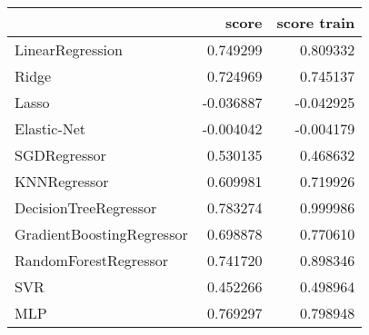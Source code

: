 \begin{tabular}{lrr}
\toprule
{} &     score &  score train \\
\midrule
LinearRegression          &  0.749299 &     0.809332 \\
Ridge                     &  0.724969 &     0.745137 \\
Lasso                     & -0.036887 &    -0.042925 \\
Elastic-Net               & -0.004042 &    -0.004179 \\
SGDRegressor              &  0.530135 &     0.468632 \\
KNNRegressor              &  0.609981 &     0.719926 \\
DecisionTreeRegressor     &  0.783274 &     0.999986 \\
GradientBoostingRegressor &  0.698878 &     0.770610 \\
RandomForestRegressor     &  0.741720 &     0.898346 \\
SVR                       &  0.452266 &     0.498964 \\
MLP                       &  0.769297 &     0.798948 \\
\bottomrule
\end{tabular}
